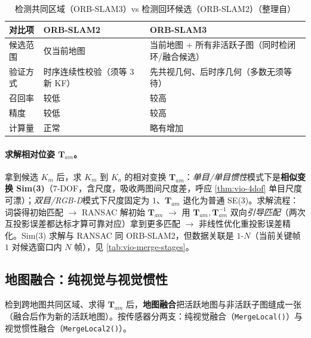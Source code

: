 \begin{table}[H]\centering\small
\caption{检测共同区域（ORB-SLAM3）vs 检测回环候选（ORB-SLAM2）（整理自\cite{campos2021orbslam3}）}
\label{tab:vio-commonregion}
\begin{tabular}{lll}
\toprule
对比项 & ORB-SLAM2 & ORB-SLAM3 \\
\midrule
候选范围 & 仅当前地图 & 当前地图 $+$ 所有非活跃子图（同时检闭环/融合候选） \\
验证方式 & 时序连续性校验（须等 $3$ 新 KF） & 先共视几何、后时序几何（多数无须等待） \\
召回率 & 较低 & 较高 \\
精度 & 较低 & 较高 \\
计算量 & 正常 & 略有增加 \\
\bottomrule
\end{tabular}
\end{table}

\paragraph{求解相对位姿 $\mathbf{T}_{am}$。}
拿到候选 $K_m$ 后，求 $K_m$ 到 $K_a$ 的相对变换 $\mathbf{T}_{am}$：\emph{单目/单目惯性}模式下是\textbf{相似变换 Sim(3)}（$7$-DOF，含尺度，吸收两图间尺度差，呼应 \cref{thm:vio-4dof} 单目尺度可漂）；\emph{双目/RGB-D}模式下尺度固定为 $1$、$\mathbf{T}_{am}$ 退化为普通 SE(3)。求解流程：词袋得初始匹配 $\to$ RANSAC 解初始 $\mathbf{T}_{am}$ $\to$ 用 $\mathbf{T}_{am},\mathbf{T}_{am}^{-1}$ 双向\emph{引导匹配}（两次互投影误差都达标才算可靠对应）拿到更多匹配 $\to$ 非线性优化重投影误差精化。Sim(3) 求解与 RANSAC 同 ORB-SLAM2，但数据关联是 $1$-$N$（当前关键帧 $1$ 对候选窗口内 $N$ 帧），见 \cref{tab:vio-merge-stages}。

\subsection{地图融合：纯视觉与视觉惯性}
\label{sec:vio-merge}

检到跨地图共同区域、求得 $\mathbf{T}_{am}$ 后，\textbf{地图融合}把活跃地图与非活跃子图缝成一张（融合后作为新的活跃地图）。按传感器分两支：纯视觉融合（\texttt{MergeLocal()}）与视觉惯性融合（\texttt{MergeLocal2()}）。

